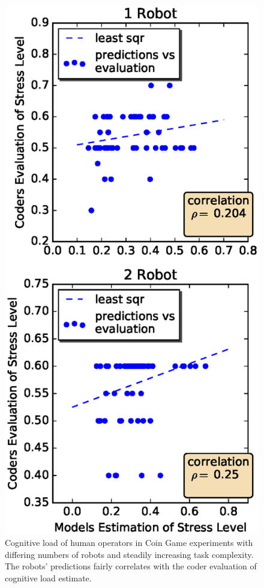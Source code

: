 \documentclass{sig-alternate}
\begin{document}

\begin{figure}  
\centering
\includegraphics[width=.5\textwidth]{coder_eval_1_2.eps}
\caption{Cognitive load of human operators in Coin Game experiments with differing numbers of robots and steadily increasing task complexity. The robots' predictions fairly correlates with the coder evaluation of cognitive load estimate.}
\label{fig:coder_eval_1_2}
\end{figure}
\end{document}
